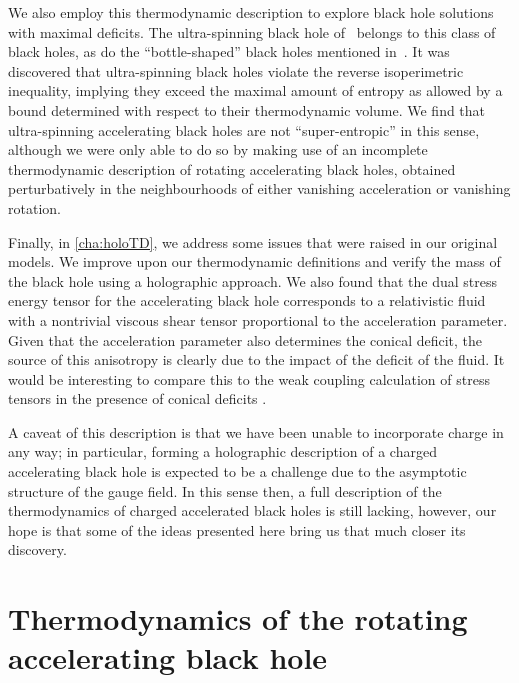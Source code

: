 \documentclass[
twoside,
openright,
frontopenright,
]{dmathesis}
\begin{document}
We also employ this thermodynamic description to explore black hole solutions
with maximal deficits. The ultra-spinning black hole
of~\cite{Klemm:2014rda,Gnecchi:2013mja,Hennigar:2014cfa} belongs to this class
of black holes, as do the ``bottle-shaped'' black holes mentioned
in~\cite{Hubeny:2009kz,Chen:2016rjt}. It was discovered that ultra-spinning
black holes violate the reverse isoperimetric inequality, implying they exceed
the maximal amount of entropy as allowed by a bound determined with respect to
their thermodynamic volume. We find that ultra-spinning accelerating black holes
are not ``super-entropic'' in this sense, although we were only able to do so by
making use of an incomplete
thermodynamic description of rotating accelerating black holes, obtained
perturbatively in the neighbourhoods of either vanishing acceleration or
vanishing rotation.

Finally, in \cref{cha:holoTD}, we address some issues that were raised in our
original models. We improve upon our thermodynamic definitions and verify the
mass of the black hole using a holographic approach. We also found that the dual
stress energy tensor for the accelerating black hole corresponds to a
relativistic fluid with a nontrivial viscous shear tensor proportional to the
acceleration parameter. Given that the acceleration parameter also determines
the conical deficit, the source of this anisotropy is clearly due to the impact
of the deficit of the fluid. It would be interesting to compare this to the weak
coupling calculation of stress tensors in the presence of conical deficits
\cite{Dowker:1977zj}.

A caveat of this description is that we have been unable to incorporate charge
in any way; in particular, forming a holographic description of a charged
accelerating black hole is expected to be a challenge due to the asymptotic
structure of the gauge field. In this sense then, a full description of the
thermodynamics of charged accelerated black holes is still lacking, however, our
hope is that some of the ideas presented here bring us that much closer its
discovery.

\section{Thermodynamics of the rotating accelerating black hole}
\end{document}
